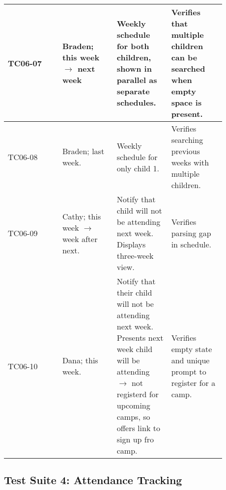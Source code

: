 \documentclass[11pt]{article}
\begin{document}
\begin{center}
\begin{longtable}{|p{0.22\linewidth}|p{0.22\linewidth}|p{0.22\linewidth}|p{0.22\linewidth}|}
	TC06-07 & Braden; this week $\longrightarrow$ next week & Weekly schedule for both children, shown in parallel as separate schedules. & Verifies that multiple children can be searched when empty space is present.\vspace*{1em}\\\hline
	TC06-08 & Braden; last week. & Weekly schedule for only child 1. & Verifies searching previous weeks with multiple children.\vspace*{1em}\\\hline
	TC06-09 & Cathy; this week $\longrightarrow$ week after next. & Notify that child will not be attending next week. Displays three-week view. & Verifies parsing gap in schedule.\vspace*{1em}\\\hline
	TC06-10 & Dana; this week. & Notify that their child will not be attending next week. Presents next week child will be attending $\rightarrow$ not registerd for upcoming camps, so offers link to sign up fro camp. & Verifies empty state and unique prompt to register for a camp.\vspace*{1em}\\\hline
\end{longtable}
\end{center}
\clearpage


\subsection*{Test Suite 4: Attendance Tracking}
\end{document}
